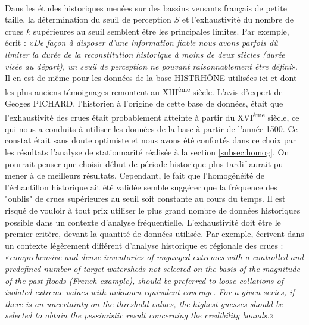 	\paragraph{} Dans les études historiques menées sur des bassins versants français de petite taille, la détermination du seuil de perception $S$ et l'exhaustivité du nombre de crues $k$ supérieures au seuil semblent être les principales limites. Par exemple, \citet{payrastre_possibility_2005} écrit : «\textit{De façon à disposer d'une information fiable nous avons parfois dû limiter la durée de la reconstitution historique à moins de deux siècles (durée visée au départ), un seuil de perception ne pouvant raisonnablement être défini}». Il en est de même pour les données de la base HISTRHÔNE utilisées ici et dont les plus anciens témoignages remontent au XIII\textsuperscript{ème} siècle. L'avis d'expert de Geoges PICHARD, l'historien à l'origine de cette base de données, était que l'exhaustivité des crues était probablement atteinte à partir du XVI\textsuperscript{ème} siècle, ce qui nous a conduits à utiliser les données de la base à partir de l'année 1500. Ce constat était sans doute optimiste et nous avons été confortés dans ce choix par les résultats l'analyse de stationnarité réalisée à la section \ref{subsec:homog}. On pourrait penser que choisir début de période historique plus tardif aurait pu mener à de meilleurs résultats. Cependant, le fait que l'homogénéité de l'échantillon historique ait été validée semble suggérer que la fréquence des "oublis" de crues supérieures au seuil soit constante au cours du temps. Il est risqué de vouloir à tout prix utiliser le plus grand nombre de données historiques possible dans un contexte d'analyse fréquentielle. L'exhaustivité doit être le premier critère, devant la quantité de données utilisée. Par exemple, \citet{gaume_bayesian_2010} écrivent dans un contexte légèrement différent d'analyse historique et régionale des crues : «\textit{comprehensive and dense inventories of ungauged extremes with a controlled and predefined number of target watersheds not selected on the basis of the magnitude of the past floods (French example), should be preferred to loose collations of isolated extreme values with unknown equivalent coverage. For a given series, if there is an uncertainty on the threshold values, the highest guesses should be selected to obtain the pessimistic result concerning the credibility bounds.}»
	
